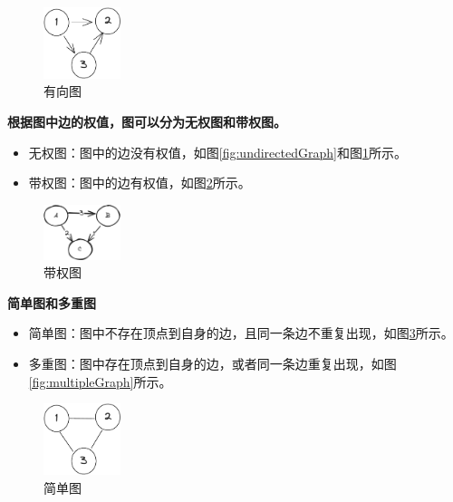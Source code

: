 \documentclass[lang=cn,newtx,10pt,scheme=chinese]{../elegantbook}
\begin{document}
  \begin{figure}[h!]
    \centering
    \includegraphics[width=0.2\textwidth]{./figure/pdf/cropped/direction.pdf}
    \caption{有向图}
    \label{fig:directedGraph}

  \end{figure}

  \textbf{根据图中边的权值，图可以分为无权图和带权图。}

  \begin{itemize}
    \item 无权图：图中的边没有权值，如图\ref{fig:undirectedGraph}和图\ref{fig:directedGraph}所示。
    \item 带权图：图中的边有权值，如图\ref{fig:weightedGraph}所示。
    \end{itemize}

    \begin{figure}[h!]
      \centering
      \includegraphics[width=0.2\textwidth]{./figure/pdf/cropped/weightedGraph.pdf}
      \caption{带权图}
      \label{fig:weightedGraph}
    \end{figure}

\textbf{简单图和多重图}

\begin{itemize}
  \item 简单图：图中不存在顶点到自身的边，且同一条边不重复出现，如图\ref{fig:simpleGraph}所示。
  \item 多重图：图中存在顶点到自身的边，或者同一条边重复出现，如图\ref{fig:multipleGraph}所示。
  \end{itemize}

  \begin{figure}[h!]
    \centering
    \includegraphics[width=0.2\textwidth]{./figure/pdf/cropped/unDirection.pdf}
    \caption{简单图}
    \label{fig:simpleGraph}
  \end{figure}
\end{document}
